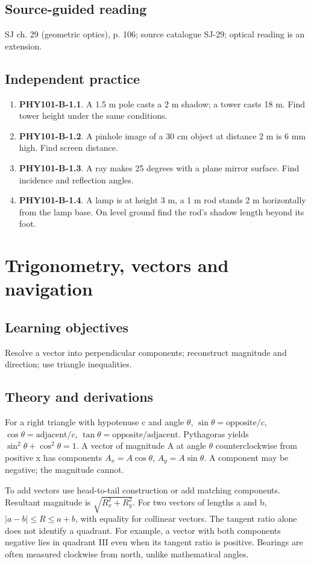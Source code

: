 \documentclass[11pt,a4paper,openany]{book}
\begin{document}
\section{Source-guided reading}
SJ ch. 29 (geometric optics), p. 106; source catalogue SJ-29; optical reading is an extension.
\section{Independent practice}
\begin{enumerate}
\item \textbf{PHY101-B-1.1}. A 1.5 m pole casts a 2 m shadow; a tower casts 18 m. Find tower height under the same conditions.
\item \textbf{PHY101-B-1.2}. A pinhole image of a 30 cm object at distance 2 m is 6 mm high. Find screen distance.
\item \textbf{PHY101-B-1.3}. A ray makes 25 degrees with a plane mirror surface. Find incidence and reflection angles.
\item \textbf{PHY101-B-1.4}. A lamp is at height 3 m, a 1 m rod stands 2 m horizontally from the lamp base. On level ground find the rod's shadow length beyond its foot.
\end{enumerate}
\chapter{Trigonometry, vectors and navigation}
\section{Learning objectives}
Resolve a vector into perpendicular components; reconstruct magnitude and direction; use triangle inequalities.
\section{Theory and derivations}
For a right triangle with hypotenuse c and angle $\theta$, $\sin\theta=\text{opposite}/c$, $\cos\theta=\text{adjacent}/c$, $\tan\theta=\text{opposite}/\text{adjacent}$. Pythagoras yields $\sin^2\theta+\cos^2\theta=1$. A vector of magnitude A at angle $\theta$ counterclockwise from positive x has components $A_x=A\cos\theta$, $A_y=A\sin\theta$. A component may be negative; the magnitude cannot.

To add vectors use head-to-tail construction or add matching components. Resultant magnitude is $\sqrt{R_x^2+R_y^2}$. For two vectors of lengths a and b, $|a-b|\le R\le a+b$, with equality for collinear vectors. The tangent ratio alone does not identify a quadrant. For example, a vector with both components negative lies in quadrant III even when its tangent ratio is positive. Bearings are often measured clockwise from north, unlike mathematical angles.
\end{document}
